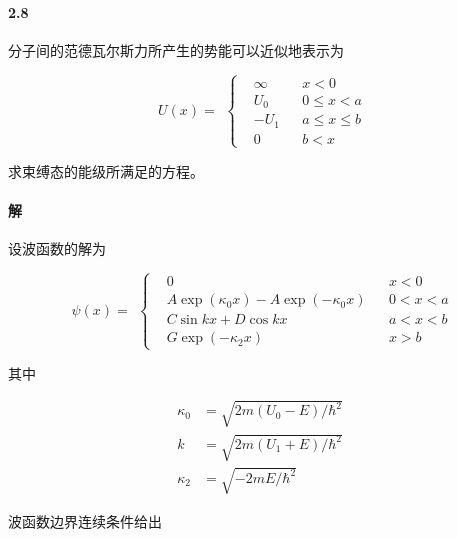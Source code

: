\documentclass{article}
\begin{document}
\paragraph{2.8}

分子间的范德瓦尔斯力所产生的势能可以近似地表示为

\begin{equation*}
  \begin{aligned}
    U \left( x  \right) = 
  \end{aligned}
  \left\{
  \begin{aligned}
    & \infty && x<0 \\
    & U_0 && 0 \leq x < a \\
    & - U_1 && a \leq x \leq b \\
    & 0 && b < x
  \end{aligned}
  \right.
\end{equation*}

求束缚态的能级所满足的方程。

\paragraph{解}

设波函数的解为

\begin{equation*}
  \begin{aligned}
    \psi \left( x \right) =
  \end{aligned}
  \left\{
  \begin{aligned}
    & 0 && x<0 \\
    & A \exp \left( \kappa_0 x \right) - A \exp \left( - \kappa_0 x \right) && 0<x<a \\
    & C \sin kx + D \cos kx && a<x<b \\
    & G \exp \left( - \kappa_2 x \right) && x>b
  \end{aligned}
  \right.
\end{equation*}

其中

\begin{equation*}
  \begin{aligned}
    \kappa_0 &= \sqrt{2 m \left( U_0 - E \right) / \hbar^2} \\
    k &= \sqrt{ 2m \left( U_1 + E \right) / \hbar^2 } \\
    \kappa_2 &= \sqrt{-2mE/ \hbar^2}
  \end{aligned}
\end{equation*}

波函数边界连续条件给出
\end{document}
